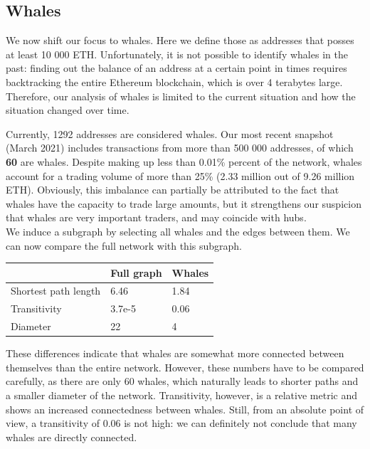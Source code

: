 \documentclass[10pt,a4paper]{article}
\begin{document}
\begin{multicols}{2}
\subsection{Whales}
We now shift our focus to whales. Here we define those as addresses that posses at least 10 000 ETH. Unfortunately, it is not possible to identify whales in the past: finding out the balance of an address at a certain point in times requires backtracking the entire Ethereum blockchain, which is over 4 terabytes large. Therefore, our analysis of whales is limited to the current situation and how the situation changed over time.

Currently, 1292 addresses are considered whales. Our most recent snapshot (March 2021) includes transactions from more than 500 000 addresses, of which \textbf{60} are whales. Despite making up less than 0.01\% percent of the network, whales account for a trading volume of more than 25\% (2.33 million out of 9.26 million ETH). Obviously, this imbalance can partially be attributed to the fact that whales have the capacity to trade large amounts, but it strengthens our suspicion that whales are very important traders, and may coincide with hubs.\\

We induce a subgraph by selecting all whales and the edges between them. We can now compare the full network with this subgraph.

\vspace{5pt}
\bgroup
\def\arraystretch{1.5}
\begin{tabular}{p{}|p{}|p{}}
 & \textbf{Full graph} & \textbf{Whales} \\ 
\hline 
Shortest path length & 6.46 & 1.84 \\
Transitivity & 3.7e-5 & 0.06\\
Diameter & 22 & 4 \\
\end{tabular}
\egroup
\vspace{5pt}

These differences indicate that whales are somewhat more connected between themselves than the entire network. However, these numbers have to be compared carefully, as there are only 60 whales, which naturally leads to shorter paths and a smaller diameter of the network. Transitivity, however, is a relative metric and shows an increased connectedness between whales. Still, from an absolute point of view, a transitivity of 0.06 is not high: we can definitely not conclude that many whales are directly connected.


\end{multicols}
\end{document}
